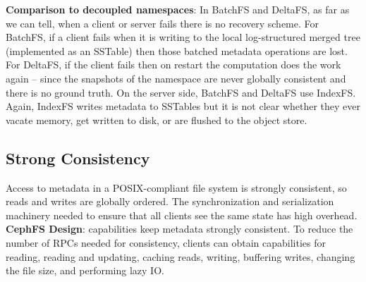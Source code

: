 \noindent\textbf{Comparison to decoupled namespaces}: In BatchFS and DeltaFS,
as far as we can tell, when a client or server fails there is no recovery
scheme. For BatchFS, if a client fails when it is writing to the local
log-structured merged tree (implemented as an SSTable) then those batched
metadata operations are lost. For DeltaFS, if the client fails then on restart
the computation does the work again -- since the snapshots of the namespace are
never globally consistent and there is no ground truth.  On the server side,
BatchFS and DeltaFS use IndexFS. Again, IndexFS writes metadata to SSTables but
it is not clear whether they ever vacate memory, get written to disk, or are
flushed to the object store.

\subsection{Strong Consistency} 
\label{sec:strong-consistency}

Access to metadata in a POSIX-compliant file system is strongly consistent, so
reads and writes are globally ordered.  The synchronization and serialization
machinery needed to ensure that all clients see the same state has high
overhead.\\

\noindent\textbf{CephFS Design}: capabilities keep metadata strongly
consistent. To reduce the number of RPCs needed for consistency, clients can
obtain capabilities for reading, reading and updating, caching reads, writing,
buffering writes, changing the file size, and performing lazy IO.

